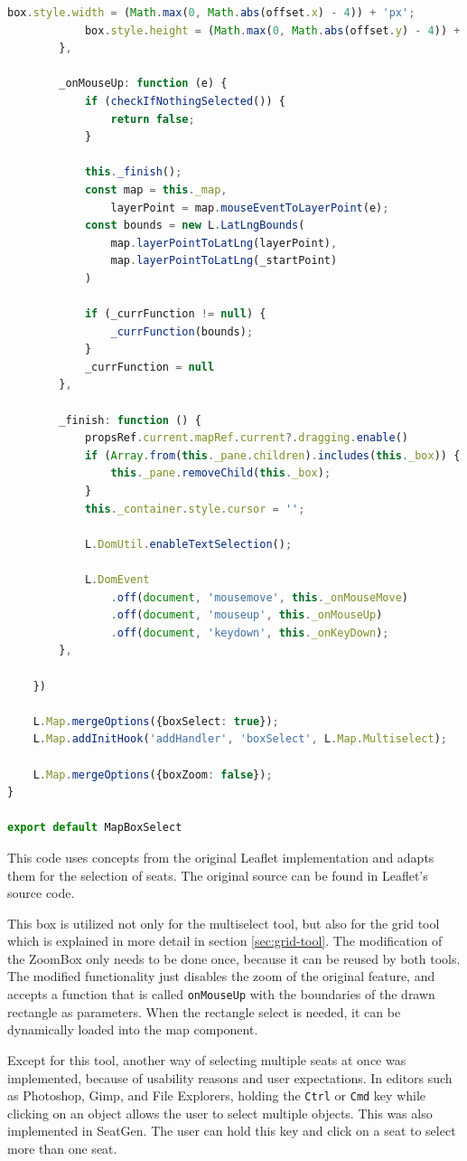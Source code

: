 \begin{lstlisting}[language=Typescript, caption={Multiselect Tool},label={lst:multiselect-tool}]
            box.style.width = (Math.max(0, Math.abs(offset.x) - 4)) + 'px';
            box.style.height = (Math.max(0, Math.abs(offset.y) - 4)) + 'px';
        },

        _onMouseUp: function (e) {
            if (checkIfNothingSelected()) {
                return false;
            }

            this._finish();
            const map = this._map,
                layerPoint = map.mouseEventToLayerPoint(e);
            const bounds = new L.LatLngBounds(
                map.layerPointToLatLng(layerPoint),
                map.layerPointToLatLng(_startPoint)
            )

            if (_currFunction != null) {
                _currFunction(bounds);
            }
            _currFunction = null
        },

        _finish: function () {
            propsRef.current.mapRef.current?.dragging.enable()
            if (Array.from(this._pane.children).includes(this._box)) {
                this._pane.removeChild(this._box);
            }
            this._container.style.cursor = '';

            L.DomUtil.enableTextSelection();

            L.DomEvent
                .off(document, 'mousemove', this._onMouseMove)
                .off(document, 'mouseup', this._onMouseUp)
                .off(document, 'keydown', this._onKeyDown);
        },

    })

    L.Map.mergeOptions({boxSelect: true});
    L.Map.addInitHook('addHandler', 'boxSelect', L.Map.Multiselect);

    L.Map.mergeOptions({boxZoom: false});
}

export default MapBoxSelect
\end{lstlisting}

This code uses concepts from the original Leaflet implementation and adapts them for the selection of seats. The original source can be found in Leaflet's source code.

This box is utilized not only for the multiselect tool, but also for the grid tool which is explained in more detail in section \ref{sec:grid-tool}. The modification of the ZoomBox only needs to be done once, because it can be reused by both tools. The modified functionality just disables the zoom of the original feature, and accepts a function that is called \texttt{onMouseUp} with the boundaries of the drawn rectangle as parameters. When the rectangle select is needed, it can be dynamically loaded into the map component.

Except for this tool, another way of selecting multiple seats at once was implemented, because of usability reasons and user expectations. In editors such as Photoshop, Gimp, and File Explorers, holding the \texttt{Ctrl} or \texttt{Cmd} key while clicking on an object allows the user to select multiple objects. This was also implemented in SeatGen. The user can hold this key and click on a seat to select more than one seat.